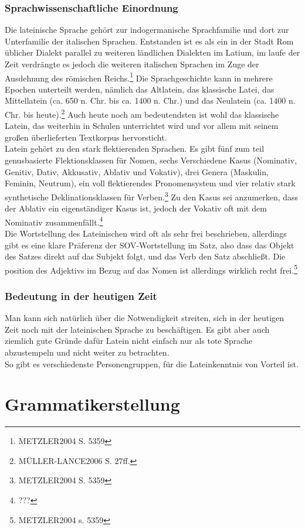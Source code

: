 \documentclass[draft,11pt]{scrartcl}
\begin{document}
\subsubsection{Sprachwissenschaftliche Einordnung}
Die lateinische Sprache gehört zur indogermanische Sprachfamilie und dort zur Unterfamilie der italischen Sprachen. Entstanden ist es als ein in der Stadt Rom üblicher Dialekt parallel zu weiteren ländlichen Dialekten im Latium, im laufe der Zeit verdrängte es jedoch die weiteren italischen Sprachen im Zuge der Ausdehnung des römischen Reichs.\footnote{METZLER2004 S. 5359} Die Sprachgeschichte kann in mehrere Epochen unterteilt werden, nämlich das Altlatein, das klassische Latei, das Mittellatein (ca. 650 n. Chr. bis ca. 1400 n. Chr.) und das Neulatein (ca. 1400 n. Chr. bis heute).\footnote{MÜLLER-LANCE2006 S. 27ff.} Auch heute noch am bedeutendsten ist wohl das klassische Latein, das weiterhin in Schulen unterrichtet wird und vor allem mit seinem großen überlieferten Textkorpus hervorsticht. \\
Latein gehört zu den stark flektierenden Sprachen. Es gibt fünf zum teil genusbasierte Flektionsklassen für Nomen, sechs Verschiedene Kasus (Nominativ, Genitiv, Dativ, Akkusativ, Ablativ und Vokativ), drei Genera (Maskulin, Feminin, Neutrum), ein voll flektierendes Pronomensystem und vier relativ stark synthetische Deklinationsklassen für Verben.\footnote{METZLER2004 S. 5359} Zu den Kasus sei anzumerken, dass der Ablativ ein eigenständiger Kasus ist, jedoch der Vokativ oft mit dem Nominativ zusammenfällt.\footnote{???} \\
Die Wortstellung des Lateinischen wird oft als sehr frei beschrieben, allerdings gibt es eine klare Präferenz der SOV-Wortstellung im Satz, also dass das Objekt des Satzes direkt auf das Subjekt folgt, und das Verb den Satz abschließt. Die position des Adjektivs im Bezug auf das Nomen ist allerdings wirklich recht frei.\footnote{METZLER2004 s. 5359}
\subsubsection{Bedeutung in der heutigen Zeit}
Man kann sich natürlich über die Notwendigkeit streiten, sich in der heutigen Zeit noch mit der lateinischen Sprache zu beschäftigen. Es gibt aber auch ziemlich gute Gründe dafür Latein nicht einfach nur als tote Sprache abzustempeln und nicht weiter zu betrachten. \\
So gibt es verschiedenste Personengruppen, für die Lateinkenntnis von Vorteil ist.
\section{Grammatikerstellung}
\end{document}
